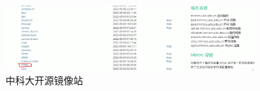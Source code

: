 \begin{figure}[htbp] 
	\centering
	\includegraphics[width=0.85\textwidth]{image/chap01/ustc.png}
	\caption{中科大开源镜像站}
	\label{fig:ustc}
\end{figure}